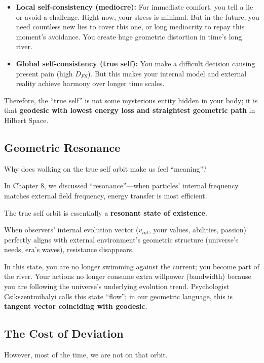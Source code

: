 \begin{itemize}
\item \textbf{Local self-consistency (mediocre):} For immediate comfort, you tell a lie or avoid a challenge. Right now, your stress is minimal. But in the future, you need countless new lies to cover this one, or long mediocrity to repay this moment's avoidance. You create huge geometric distortion in time's long river.

\item \textbf{Global self-consistency (true self):} You make a difficult decision causing present pain (high $D_{FS}$). But this makes your internal model and external reality achieve harmony over longer time scales.
\end{itemize}

Therefore, the ``true self'' is not some mysterious entity hidden in your body; it is that \textbf{geodesic with lowest energy loss and straightest geometric path} in Hilbert Space.

\subsection{Geometric Resonance}

Why does walking on the true self orbit make us feel ``meaning''?

In Chapter 8, we discussed ``resonance''---when particles' internal frequency matches external field frequency, energy transfer is most efficient.

The true self orbit is essentially a \textbf{resonant state of existence}.

When observers' internal evolution vector ($v_{int}$, your values, abilities, passion) perfectly aligns with external environment's geometric structure (universe's needs, era's waves), resistance disappears.

In this state, you are no longer swimming against the current; you become part of the river. Your actions no longer consume extra willpower (bandwidth) because you are following the universe's underlying evolution trend. Psychologist Csikszentmihalyi calls this state ``flow''; in our geometric language, this is \textbf{tangent vector coinciding with geodesic}.

\subsection{The Cost of Deviation}

However, most of the time, we are not on that orbit.

